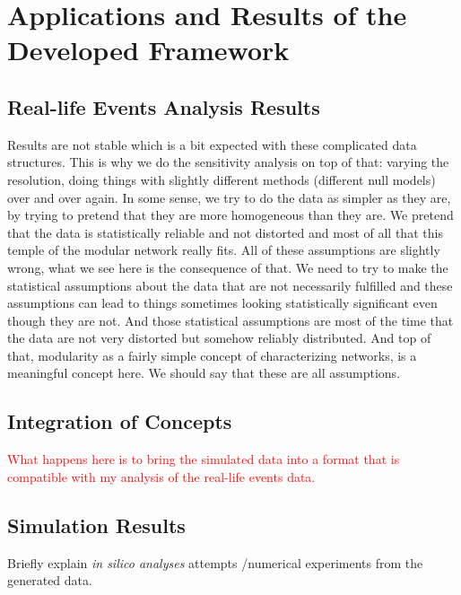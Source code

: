 \section{Applications and Results of the Developed Framework}
\subsection{Real-life Events Analysis Results}
Results are not stable which is a bit expected with these complicated data structures. This is why we do the sensitivity analysis on top of that: varying the resolution, doing things with slightly different methods (different null models) over and over again. In some sense, we try to do the data as simpler as they are, by trying to pretend that they are more homogeneous than they are. We pretend that the data is statistically reliable and not distorted and most of all that this temple of the modular network really fits. All of these assumptions are slightly wrong, what we see here is the consequence of that. We need to try to make the statistical assumptions about the data that are not necessarily fulfilled and these assumptions can lead to things sometimes looking statistically significant even though they are not. And those statistical assumptions are most of the time that the data are not very distorted but somehow reliably distributed. And top of that, modularity as a fairly simple concept of characterizing networks, is a meaningful concept here. We should say that these are all assumptions.
\subsection{Integration of Concepts}
\textcolor{red}{What happens here is to bring the simulated data into a format that is compatible with my analysis of the real-life events data.}


\subsection{Simulation Results}
{\color{red} 
	
	Briefly explain \emph{in silico analyses} attempts /numerical experiments from the generated data.
	
}




